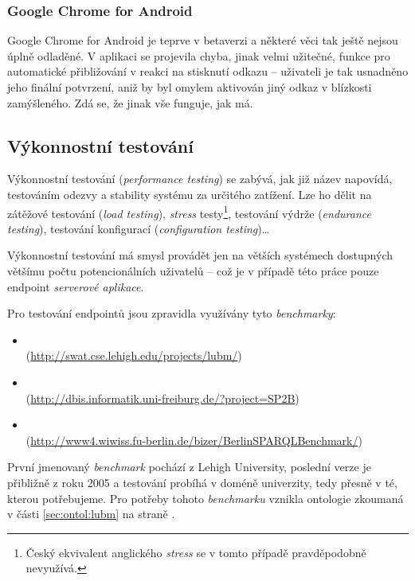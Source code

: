 \subsubsection*{Google Chrome for Android}
Google Chrome for Android je teprve v betaverzi a některé věci tak ještě nejsou úplně odladěné. V aplikaci se projevila chyba, jinak velmi užitečné, funkce pro automatické přibližování v reakci na stisknutí odkazu -- uživateli je tak usnadněno jeho finální potvrzení, aniž by byl omylem aktivován jiný odkaz v blízkosti zamýšleného. Zdá se, že jinak vše funguje, jak má.


\subsection{Výkonnostní testování}
Výkonnostní testování (\textit{performance testing}) se zabývá, jak již název napovídá, testováním odezvy a stability systému za určitého zatížení. Lze ho dělit na zátěžové testování (\textit{load testing}), \textit{stress} testy\footnote{Český ekvivalent anglického \textit{stress} se v tomto případě pravděpodobně nevyužívá.}, testování výdrže (\textit{endurance testing}), testování konfigurací (\textit{configuration testing})\dots

Výkonnostní testování má smysl provádět jen na větších systémech dostupných většímu počtu potencionálních uživatelů -- což je v případě této práce pouze  endpoint \textit{serverové aplikace}.

Pro testování  endpointů jsou zpravidla využívány tyto \textit{benchmarky}:

\begin{itemize}
 \item {}\\ (\url{http://swat.cse.lehigh.edu/projects/lubm/})
 \item {}\\ (\url{http://dbis.informatik.uni-freiburg.de/?project=SP2B})
 \item {}\\ (\url{http://www4.wiwiss.fu-berlin.de/bizer/BerlinSPARQLBenchmark/})
\end{itemize}

První jmenovaný \textit{benchmark} pochází z Lehigh University, poslední verze je přibližně z roku 2005 a testování probíhá v doméně univerzity, tedy přesně v té, kterou potřebujeme. Pro potřeby tohoto \textit{benchmarku} vznikla ontologie zkoumaná v části \ref{sec:ontol:lubm} na straně \pageref{sec:ontol:lubm}.

